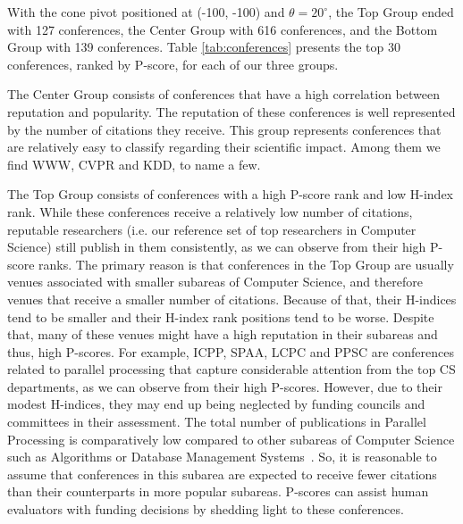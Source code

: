 \documentclass[man,floatsintext]{apa6}
\let \cite \parencite
\begin{document}
With the cone pivot positioned at (-100, -100) and $ \theta=20^{\circ} $, the Top Group ended with 127 conferences, the 
Center Group with 616 conferences, and the Bottom Group with 139 conferences. Table 
\ref{tab:conferences} presents the top 30 conferences, ranked by P-score, for each of our three groups.

The Center Group consists of conferences that have a high correlation between reputation and
popularity. The reputation of these conferences is well represented by the number of citations
they receive. This group represents conferences that are relatively easy to classify regarding
their scientific impact. Among them we find WWW, CVPR and KDD, to name a few.

The Top Group consists of conferences with a high P-score rank and low H-index rank. While these conferences
receive a relatively low number of citations, reputable researchers (i.e. our reference set of top researchers in Computer Science) still publish 
in them consistently, as we can observe from their high P-score ranks. The primary reason is that
conferences in the Top Group are usually venues associated with smaller subareas of Computer Science, and therefore venues that receive a smaller
number of citations. Because of that, their H-indices tend to be smaller and their H-index rank positions tend to be worse. Despite that, many of these venues might have a high reputation in their subareas and thus, high P-scores. 
For example, ICPP, SPAA, LCPC and PPSC are conferences related to parallel processing that capture
considerable attention from the top CS departments, as we can observe from their high P-scores. However,
due to their modest H-indices, they may end up being neglected by funding councils and committees in
their assessment. The total number of publications in Parallel Processing is comparatively low 
compared to other subareas of Computer Science such as Algorithms or Database Management Systems~\cite{Hoonlor2013}. So, it is reasonable to assume that conferences 
in this subarea are expected to receive fewer citations than their counterparts in more popular subareas.
P-scores can assist human evaluators with funding decisions by shedding light to these conferences.
\end{document}
